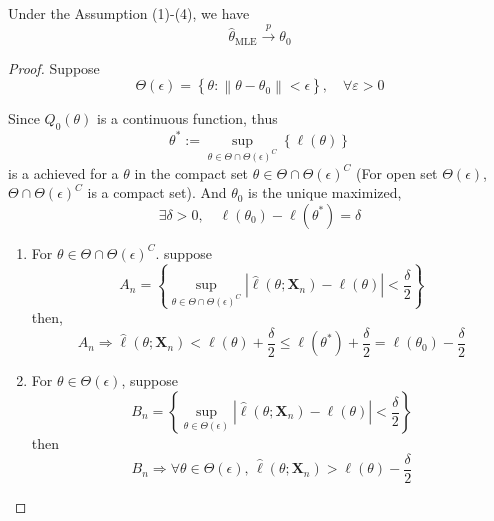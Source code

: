 \begin{theorem}
    Under the Assumption (1)-(4), we have
    \begin{equation}
        \hat{\theta}_{\text{MLE}}\stackrel{p}{\rightarrow}\theta_{0}
    \end{equation}
\end{theorem}

\begin{proof}
    Suppose
    \begin{equation*}
        \Theta(\epsilon)=\left\{\theta:\left\|\theta-\theta_{0}\right\|<\epsilon\right\},\quad\forall\varepsilon>0
    \end{equation*}

    Since $Q_{0}(\theta)$ is a continuous function, thus
    \begin{equation*}
        \theta^{*}:=\sup_{\theta\in\Theta\cap \Theta(\epsilon)^{C}}\left\{\ell(\theta)\right\}
    \end{equation*}
    is a achieved for a $\theta$ in the compact set $\theta\in\Theta\cap \Theta(\epsilon)^{C}$ (For open set $\Theta(\epsilon)$, $\Theta\cap\Theta(\epsilon)^{C}$ is a compact set). And $\theta_{0}$ is the unique maximized,
    \begin{equation*}
        \exists\delta>0,\quad\ell\left(\theta_{0}\right)-\ell\left(\theta^{*}\right)=\delta
    \end{equation*}

    \begin{enumerate}
        \item For $\theta\in\Theta\cap\Theta(\epsilon)^{C}$. suppose
              \begin{equation}
                  A_{n}=\left\{\sup_{\theta\in\Theta\cap\Theta(\epsilon)^{C}}\left|\hat{\ell}\left(\theta;\textbf{X}_{n}\right)-\ell(\theta)\right|<\frac{\delta}{2}\right\}
              \end{equation}
              then,
              \begin{equation}
                  A_{n}\Longrightarrow\hat{\ell}\left(\theta;\textbf{X}_{n}\right)<\ell(\theta)+\frac{\delta}{2}\leq \ell\left(\theta^{*}\right)+\frac{\delta}{2}=\ell\left(\theta_{0}\right)-\frac{\delta}{2}
              \end{equation}
        \item For $\theta\in\Theta(\epsilon)$, suppose
              \begin{equation}
                  B_{n}=\left\{\sup_{\theta\in\Theta(\epsilon)}\left|\hat{\ell}\left(\theta;\mathbf{X}_{n}\right)-\ell(\theta)\right|<\frac{\delta}{2}\right\}
              \end{equation}
              then
              \begin{equation}
                  B_{n}\Longrightarrow\forall\theta\in\Theta(\epsilon),\,\hat{\ell}\left(\theta;\mathbf{X}_{n}\right)>\ell(\theta)-\frac{\delta}{2}
              \end{equation}
    \end{enumerate}


\end{proof}
